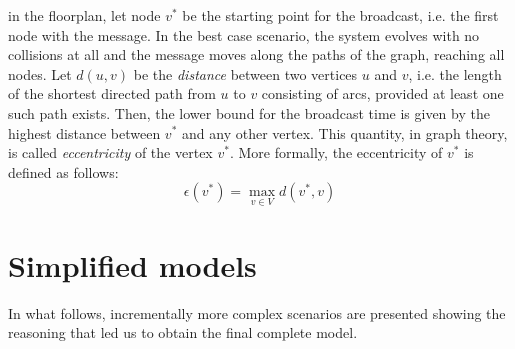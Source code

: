 in the floorplan, let node $v^{*}$ be the starting point for the broadcast, i.e.
the first node with the message. In the best case scenario, the system evolves
with no collisions at all and the message moves along the paths of the graph,
reaching all nodes. Let $d(u, v)$ be the \textit{distance} between two vertices
$u$ and $v$, i.e. the length of the shortest directed path from $u$ to $v$
consisting of arcs, provided at least one such path exists. Then, the lower
bound for the broadcast time is given by the highest distance between $v^{*}$
and any other vertex. This quantity, in graph theory, is called
\textit{eccentricity} of the vertex $v^{*}$. More formally, the eccentricity of
$v^{*}$ is defined as follows:
\begin{equation}
\epsilon(v^{*}) = \max_{v{\in}V} d(v^{*}, v)
\end{equation}
\section{Simplified models}
In what follows, incrementally more complex scenarios are presented showing the
reasoning that led us to obtain the final complete model.
